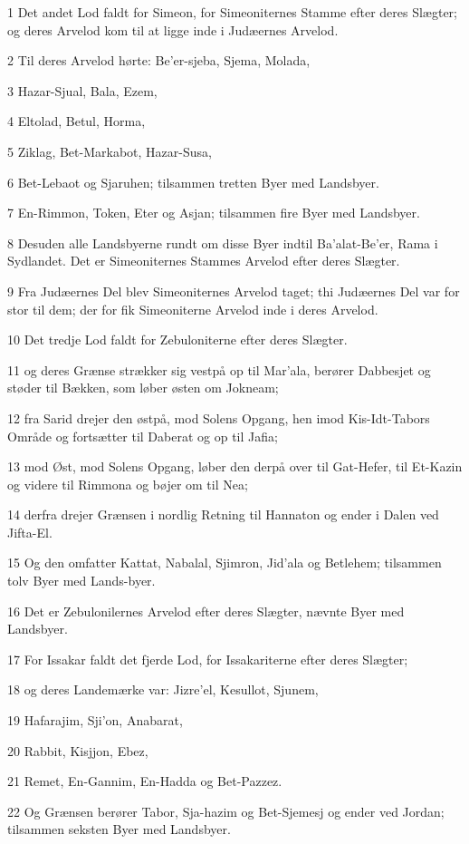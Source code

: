\par 1 Det andet Lod faldt for Simeon, for Simeoniternes Stamme efter deres Slægter; og deres Arvelod kom til at ligge inde i Judæernes Arvelod.
\par 2 Til deres Arvelod hørte: Be'er-sjeba, Sjema, Molada,
\par 3 Hazar-Sjual, Bala, Ezem,
\par 4 Eltolad, Betul, Horma,
\par 5 Ziklag, Bet-Markabot, Hazar-Susa,
\par 6 Bet-Lebaot og Sjaruhen; tilsammen tretten Byer med Landsbyer.
\par 7 En-Rimmon, Token, Eter og Asjan; tilsammen fire Byer med Landsbyer.
\par 8 Desuden alle Landsbyerne rundt om disse Byer indtil Ba'alat-Be'er, Rama i Sydlandet. Det er Simeoniternes Stammes Arvelod efter deres Slægter.
\par 9 Fra Judæernes Del blev Simeoniternes Arvelod taget; thi Judæernes Del var for stor til dem; der for fik Simeoniterne Arvelod inde i deres Arvelod.
\par 10 Det tredje Lod faldt for Zebuloniterne efter deres Slægter.
\par 11 og deres Grænse strækker sig vestpå op til Mar'ala, berører Dabbesjet og støder til Bækken, som løber østen om Jokneam;
\par 12 fra Sarid drejer den østpå, mod Solens Opgang, hen imod Kis-Idt-Tabors Område og fortsætter til Daberat og op til Jafia;
\par 13 mod Øst, mod Solens Opgang, løber den derpå over til Gat-Hefer, til Et-Kazin og videre til Rimmona og bøjer om til Nea;
\par 14 derfra drejer Grænsen i nordlig Retning til Hannaton og ender i Dalen ved Jifta-El.
\par 15 Og den omfatter Kattat, Nabalal, Sjimron, Jid'ala og Betlehem; tilsammen tolv Byer med Lands-byer.
\par 16 Det er Zebulonilernes Arvelod efter deres Slægter, nævnte Byer med Landsbyer.
\par 17 For Issakar faldt det fjerde Lod, for Issakariterne efter deres Slægter;
\par 18 og deres Landemærke var: Jizre'el, Kesullot, Sjunem,
\par 19 Hafarajim, Sji'on, Anabarat,
\par 20 Rabbit, Kisjjon, Ebez,
\par 21 Remet, En-Gannim, En-Hadda og Bet-Pazzez.
\par 22 Og Grænsen berører Tabor, Sja-hazim og Bet-Sjemesj og ender ved Jordan; tilsammen seksten Byer med Landsbyer.
